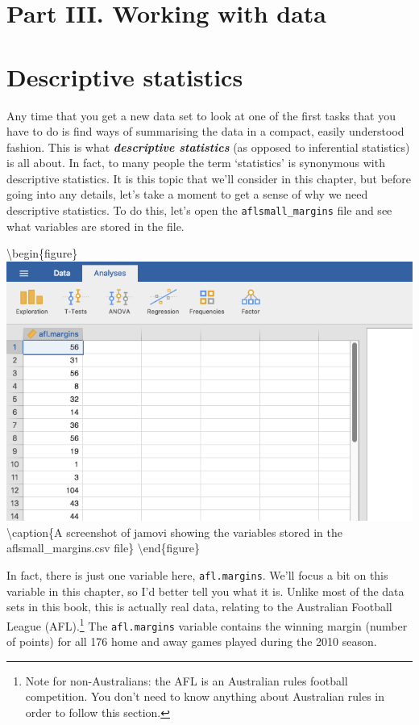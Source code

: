 \documentclass[
]{book}
\begin{document}
\hypertarget{part-iii.-working-with-data}{%
\chapter*{Part III. Working with data}\label{part-iii.-working-with-data}}

\hypertarget{descriptives}{%
\chapter{Descriptive statistics}\label{descriptives}}

Any time that you get a new data set to look at one of the first tasks that you have to do is find ways of summarising the data in a compact, easily understood fashion. This is what \textbf{\emph{descriptive statistics}} (as opposed to inferential statistics) is all about. In fact, to many people the term `statistics' is synonymous with descriptive statistics. It is this topic that we'll consider in this chapter, but before going into any details, let's take a moment to get a sense of why we need descriptive statistics. To do this, let's open the \texttt{aflsmall\_margins} file and see what variables are stored in the file.

\textbackslash begin\{figure\}
\includegraphics[width=9.54in]{img/descriptives/aflsmall_margins} \textbackslash caption\{A screenshot of jamovi showing the variables stored in the aflsmall\_margins.csv file\}\label{fig:aflsmall}
\textbackslash end\{figure\}

In fact, there is just one variable here, \texttt{afl.margins}. We'll focus a bit on this variable in this chapter, so I'd better tell you what it is. Unlike most of the data sets in this book, this is actually real data, relating to the Australian Football League (AFL).\footnote{Note for non-Australians: the AFL is an Australian rules football competition. You don't need to know anything about Australian rules in order to follow this section.} The \texttt{afl.margins} variable contains the winning margin (number of points) for all 176 home and away games played during the 2010 season.
\end{document}
